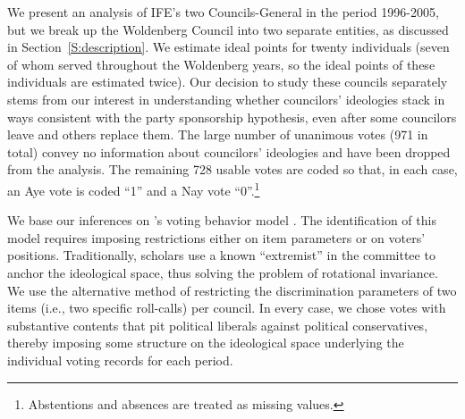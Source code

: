 \documentclass[12 pt, letter]{article}
\begin{document}
We present an analysis of IFE's two Councils-General in the period 1996-2005, but we break up the Woldenberg Council into two separate entities, as discussed in Section~\ref{S:description}.  We estimate ideal points for twenty individuals (seven of whom served throughout the Woldenberg years, so the ideal points of these individuals are estimated twice).  Our decision to study these councils separately stems from our interest in understanding whether councilors' ideologies stack in ways consistent with the party sponsorship hypothesis, even after some councilors leave and others replace them. The large number of unanimous votes (971 in total) convey no information about councilors' ideologies and have been dropped from the analysis.  The remaining 728 usable votes are coded so that, in each case, an Aye vote is coded ``1'' and a Nay vote ``0''.\footnote{Abstentions and absences are treated as missing values.}


We base our inferences on \citeauthor*{Clinton2004}'s voting behavior model \citep{Clinton2004, Martin2002}.  The identification of this model requires imposing restrictions either on item parameters or on voters' positions.  Traditionally, scholars use a known ``extremist'' in the committee to anchor the ideological space, thus solving the problem of rotational invariance.  We use the alternative method of restricting the discrimination parameters of two items (i.e., two specific roll-calls) per council. In every case, we chose votes with substantive contents that pit political liberals against political conservatives, thereby imposing some structure on the ideological space underlying the individual voting records for each period.
\end{document}
